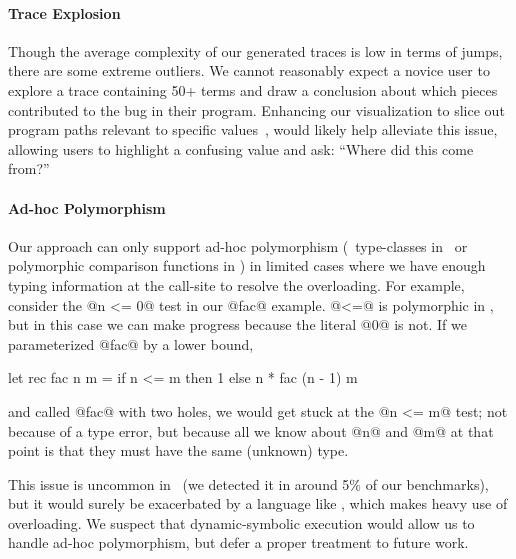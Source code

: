 \paragraph{Trace Explosion}
Though the average complexity of our generated traces is low in terms of
jumps, there are some extreme outliers.
%
We cannot reasonably expect a novice user to explore a trace containing
50+ terms and draw a conclusion about which pieces contributed to the
bug in their program.
%
Enhancing our visualization to slice out program paths relevant to
specific values~\cite{Perera2012-dy}, would likely help alleviate this
issue, allowing users to highlight a confusing value and ask: ``Where
did this come from?''

\paragraph{Ad-hoc Polymorphism}
Our approach can only support ad-hoc polymorphism (\eg\ type-classes in
\haskell\ or polymorphic comparison functions in \ocaml) in limited cases
where we have enough typing information at the call-site to resolve the
overloading. For example, consider the @n <= 0@ test in our @fac@ example.
@<=@ is polymorphic in \ocaml, but in this case we can make progress because
the literal @0@ is not. If we parameterized @fac@ by a lower bound, \eg
%
\begin{code}
  let rec fac n m =
    if n <= m then
      1
    else
      n * fac (n - 1) m
\end{code}
%
and called @fac@ with two holes, we would get stuck at the @n <= m@
test; not because of a type error, but because all we know about
@n@ and @m@ at that point is that they must have the same (unknown)
type.

This issue is uncommon in \ocaml\
(we detected it in around 5\% of our benchmarks),
but it would surely be exacerbated
by a language like \haskell, which makes heavy use of overloading. We
suspect that dynamic-symbolic execution would allow us to handle ad-hoc
polymorphism, but defer a proper treatment to future work.


